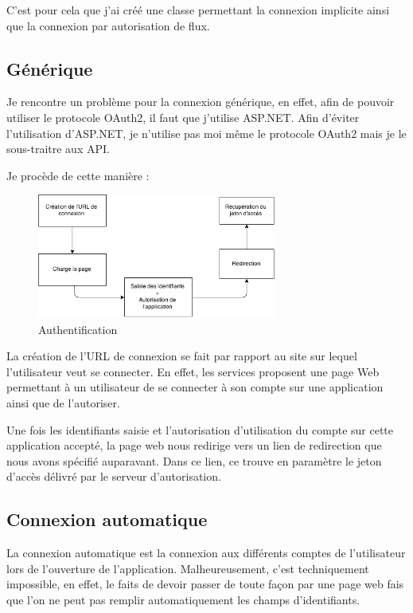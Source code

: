 \documentclass[11pt]{report} %
\begin{document}
	C'est pour cela que j'ai créé une classe permettant la connexion implicite ainsi que la connexion par autorisation de flux.
	
	\subsection{Générique}
	Je rencontre un problème pour la connexion générique, en effet, afin de pouvoir utiliser le protocole OAuth2, il faut que j'utilise ASP.NET. 
	Afin d'éviter l'utilisation d'ASP.NET, je n'utilise pas moi même le protocole OAuth2 mais je le sous-traitre aux API.
	
	Je procède de cette manière :
	
			\begin{figure}[h]
				\center
				\includegraphics[width=0.7\textwidth]{../img/auth.png}
				\caption{Authentification}
				\label{authentification}
			\end{figure}
	
	
	La création de l'URL de connexion se fait par rapport au site sur lequel l'utilisateur veut se connecter. En effet, les services proposent une page Web permettant à un utilisateur de se connecter à son compte sur une application ainsi que de l'autoriser.
	
	Une fois les identifiants saisie et l'autorisation d'utilisation du compte sur cette application accepté, la page web nous redirige vers un lien de redirection que nous avons spécifié auparavant. Dans ce lien, ce trouve en paramètre le jeton d'accès délivré par le serveur d'autorisation.

	\subsection{Connexion automatique}
	La connexion automatique est la connexion aux différents comptes de l'utilisateur lors de l'ouverture de l'application. Malheureusement, c'est techniquement impossible, en effet, le faits de devoir passer de toute façon par une page web fais que l'on ne peut pas remplir automatiquement les champs d'identifiants.
	
\end{document}
